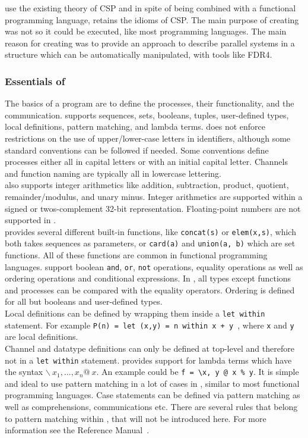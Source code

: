 \cspm{} use the existing theory of CSP and in spite of being combined with a functional programming language, \cspm{} retains the idioms of CSP.
The main purpose of creating \cspm{} was not so it could be executed, like most programming languages. The main reason for creating \cspm{} was to provide an approach to describe parallel systems in a structure which can be automatically manipulated, with tools like FDR4.
\subsubsection{Essentials of \cspm}
The basics of a \cspm{} program are to define the processes, their functionality, and the communication. \cspm{} supports sequences, sets, booleans, tuples, user-defined types, local definitions, pattern matching, and lambda terms.
\cspm{} does not enforce restrictions on the use of upper/lower-case letters in identifiers, although some standard conventions can be followed if needed. Some conventions define processes either all in capital letters or with an initial capital letter. Channels and function naming are typically all in lowercase lettering.\\

\cspm{} also supports integer arithmetics like addition, subtraction, product, quotient, remainder/modulus, and unary minus. Integer arithmetics are supported within a signed or twos-complement 32-bit representation.
Floating-point numbers are not supported in \cspm. \\

\cspm{} provides several different built-in functions, like \texttt{concat(s)} or \texttt{elem(x,s)}, which both takes sequences as parameters, or \texttt{card(a)} and \texttt{union(a, b)} which are set functions. All of these functions are common in functional programming languages. \cspm{} support boolean \texttt{and}, \texttt{or}, \texttt{not} operations, equality operations as well as ordering operations and conditional expressions. In \cspm, all types except functions and processes can be compared with the equality operators. Ordering is defined for all but booleans and user-defined types. \\

Local definitions can be defined by wrapping them inside a \texttt{let within} statement. For example \texttt{P(n) = let (x,y) = n within x + y }, where \texttt{x} and \texttt{y} are local definitions.\\ Channel and datatype definitions can only be defined at top-level and therefore not in a \texttt{let within} statement.
\cspm{} provides support for lambda terms which have the syntax $\backslash \  x_1,...,x_n @\ x$. An example could be \texttt{f = \textbackslash x, y @ x \% y}.
It is simple and ideal to use pattern matching in a lot of cases in \cspm, similar to most functional programming languages. Case statements can be defined via pattern matching as well as comprehensions, communications etc. There are several rules that belong to pattern matching within \cspm{}, that will not be introduced here. For more information see the \cspm{} Reference Manual~\cite{Scattergood2011}.\\

